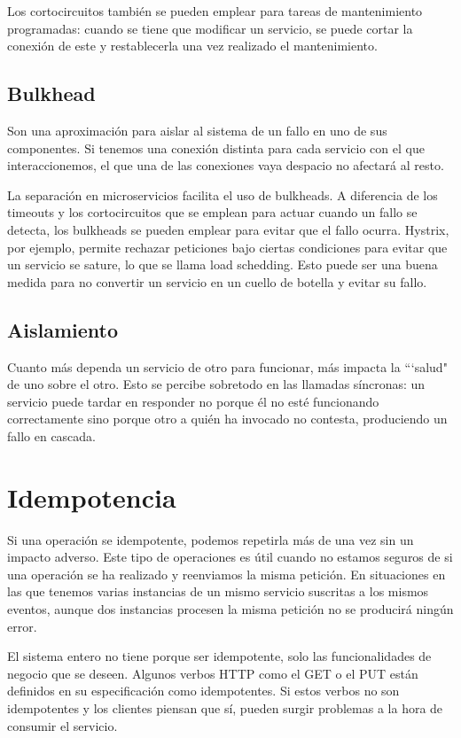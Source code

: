 \documentclass[11pt,a4paper]{article}
\begin{document}
Los cortocircuitos también se pueden emplear para tareas de mantenimiento programadas: cuando se tiene que modificar un servicio, se puede cortar la conexión de este y restablecerla una vez realizado el mantenimiento.

\subsection{Bulkhead}

Son una aproximación para aislar al sistema de un fallo en uno de sus componentes. Si tenemos una conexión distinta para cada servicio con el que interaccionemos, el que una de las conexiones vaya despacio no afectará al resto. 

La separación en microservicios facilita el uso de bulkheads. A diferencia de los timeouts y los cortocircuitos que se emplean para actuar cuando un fallo se detecta, los bulkheads se pueden emplear para evitar que el fallo ocurra. Hystrix, por ejemplo, permite rechazar peticiones bajo ciertas condiciones para evitar que un servicio se sature, lo que se llama load schedding. Esto puede ser una buena medida para no convertir un servicio en un cuello de botella y evitar su fallo.

\subsection{Aislamiento}

Cuanto más dependa un servicio de otro para funcionar, más impacta la ```salud" de uno sobre el otro. Esto se percibe sobretodo en las llamadas síncronas: un servicio puede tardar en responder no porque él no esté funcionando correctamente sino porque otro a quién ha invocado no contesta, produciendo un fallo en cascada.

\section{Idempotencia}

Si una operación se idempotente, podemos repetirla más de una vez sin un impacto adverso. Este tipo de operaciones es útil cuando no estamos seguros de si una operación se ha realizado y reenviamos la misma petición. En situaciones en las que tenemos varias instancias de un mismo servicio suscritas a los mismos eventos, aunque dos instancias procesen la misma petición no se producirá ningún error.

El sistema entero no tiene porque ser idempotente, solo las funcionalidades de negocio que se deseen. Algunos verbos HTTP como el GET o el PUT están definidos en su especificación como idempotentes. Si estos verbos no son idempotentes y los clientes piensan que sí, pueden surgir problemas a la hora de consumir el servicio.
\end{document}

